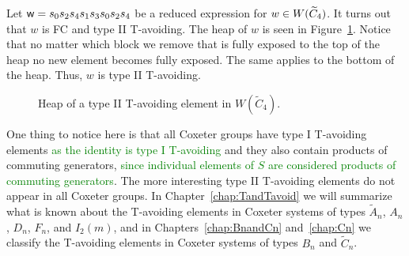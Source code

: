 \begin{example}
Let $\mathsf{w}=s_0s_2s_4s_1s_3s_0s_2s_4$ be a reduced expression for $w \in W(\widetilde{C}_4)$. It turns out that $w$ is FC and type II T-avoiding. The heap of $w$ is seen in Figure~\ref{fig:sandwich1}. Notice that no matter which block we remove that is fully exposed to the top of the heap no new element becomes fully exposed. The same applies to the bottom of the heap. Thus, $w$ is type II T-avoiding. 
\begin{figure}[h!]
\centering
{}
\caption{Heap of a type II T-avoiding element in $W(\widetilde{C}_4)$.}\label{fig:sandwich1}	
\end{figure}
\end{example}


One thing to notice here is that all Coxeter groups have type I T-avoiding elements \textcolor{green}{as the identity is type I T-avoiding} and  they also contain products of commuting generators, \textcolor{green}{since individual elements of $S$ are considered products of commuting generators}. The more interesting type II T-avoiding elements do not appear in all Coxeter groups. In Chapter~\ref{chap:TandTavoid} we will summarize what is known about the T-avoiding elements in Coxeter systems of types $\widetilde{A}_n$, $A_n$, $D_n$, $F_n$, and $I_2(m)$, and in Chapters~\ref{chap:BnandCn} and~\ref{chap:Cn} we classify the T-avoiding elements in Coxeter systems of types $B_n$ and $\widetilde{C}_n$. 



